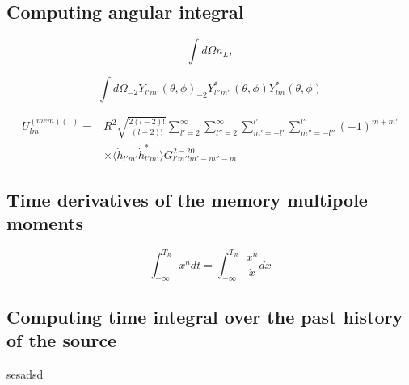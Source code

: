\documentclass[prd,preprintnumbers,twocolumn,eqsecnum,floatfix,letter]{revtex4}
\begin{document}
\subsection{Computing angular integral}


\begin{equation}
	\int d\Omega n_{L},
\end{equation}

\begin{equation}
	\int d\Omega _{-2}Y_{l'm'}(\theta,\phi)_{-2}Y_{l''m''}^{*}(\theta, \phi)Y_{lm}^{*}(\theta, \phi)
\end{equation}

\begin{align}
	U_{lm}^{(mem)(1)}=&R^{2}\sqrt{\frac{2(l-2)!}{(l+2)!}}\sum_{l'=2}^{\infty}\sum_{l''=2}^{\infty}\sum_{m'=-l'}^{l'}\sum_{m''=-l''}^{l''}(-1)^{m+m'}\\
	&\times\Bigg\langle \dot{h}_{l'm'}\dot{h}_{l'm'}^{*}\Bigg\rangle G^{2-20}_{l'm'lm'-m''-m}
\end{align}

\subsection{Time derivatives of the memory multipole moments}

\begin{equation}
	\int_{-\infty}^{T_{R}} x^{n}dt=\int_{-\infty}^{T_{R}}\frac{x^{n}}{\dot{x}}dx
\end{equation}

\subsection{Computing time integral over the past history of the source}
sesadsd
 
\end{document}
